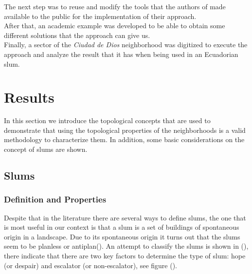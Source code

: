 \documentclass[10pt]{article}
\begin{document}
The next step was to reuse and modify the tools that the authors of \cite{bre} made available to the public for the implementation of their approach.\\

After that, an academic example was developed to be able to obtain some different solutions that the approach can give us.\\

Finally, a sector of the \emph{Ciudad de Dios} neighborhood was digitized to execute the approach and analyze the result that it has when being used in an Ecuadorian slum.\\


\section{Results}

In this section we introduce the topological concepts that are used to demonstrate that using the topological properties of the neighborhoods is a valid methodology to characterize them. In addition, some basic considerations on the concept of slums are shown.

\subsection{Slums}
\subsubsection{Definition and Properties}
Despite that in the literature there are several ways to define slums, the one that is most useful in our context is that a slum is a set of buildings of spontaneous origin in a landscape. Due to its spontaneous origin it turns out that the slums seem to be planless or antiplan(). An attempt to classify the slums is shown in (), there indicate that there are two key factors to determine the type of slum: hope (or despair) and escalator (or non-escalator), see figure ().\\
\end{document}
